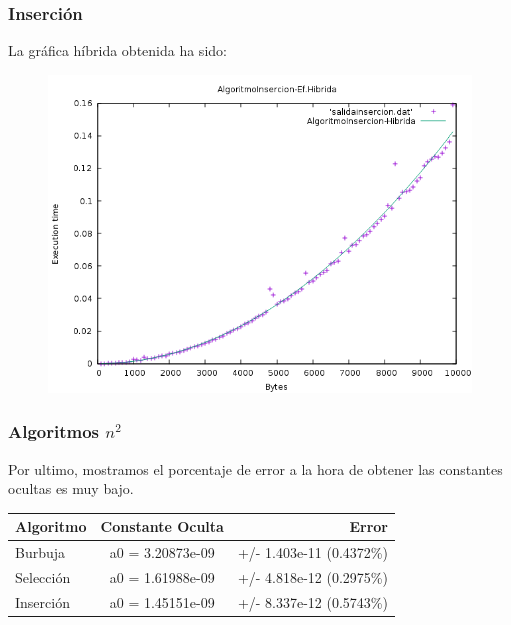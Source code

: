 \documentclass{beamer}
\begin{document}
\begin{frame}
	\frametitle{Inserción}
	La gráfica híbrida obtenida ha sido:
	\begin{figure}
		\centering
		\includegraphics[width=0.7\linewidth]{imagenes/algoritmoInsercion-hibrida}
		\caption{}
		\label{fig:E3}
	\end{figure}
	
\end{frame}


\begin{frame}
	\frametitle{Algoritmos $n^2$}
	Por ultimo, mostramos el porcentaje de error a la hora de obtener las constantes ocultas es muy bajo.\\
	
	\begin{center}
		\begin{tabular}{| l | c | r |}
			\hline
			\textbf{Algoritmo} & \textbf{Constante Oculta} & \textbf{Error} \\ \hline
			Burbuja & a0 = 3.20873e-09 & +/- 1.403e-11 (0.4372\%)\\ \hline
			Selección & a0 = 1.61988e-09 & +/- 4.818e-12 (0.2975\%) \\ \hline
			Inserción & a0 = 1.45151e-09 &  +/- 8.337e-12    (0.5743\%) \\ \hline
		\end{tabular}
	\end{center}

	
	
\end{frame}
\end{document}
